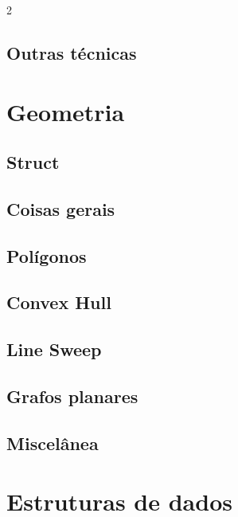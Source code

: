 \documentclass{article}
\begin{document}
\begin{multicols}{2}
\subsection{Outras técnicas}


\clearpage

\section{Geometria}

\subsection{Struct}


\subsection{Coisas gerais}


\subsection{Polígonos}


\subsection{Convex Hull}


\subsection{Line Sweep}


\subsection{Grafos planares}


\subsection{Miscelânea}


\clearpage

\section{Estruturas de dados}




\end{multicols}
\end{document}
